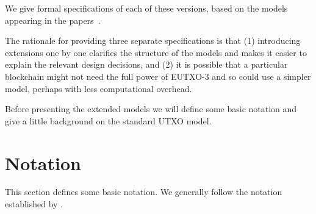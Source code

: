 \documentclass[a4paper]{article}
\theoremstyle{definition}  %
\begin{document}
\noindent We give formal specifications of each of these versions,
based on the models appearing in the
papers~\citep{Zahnentferner18-Chimeric, Zahnentferner18-UTxO}.

\medskip

The rationale for providing three separate specifications is that (1)
introducing extensions one by one clarifies the structure of the
models and makes it easier to explain the relevant design decisions,
and (2) it is possible that a particular blockchain might not need the
full power of EUTXO-3 and so could use a simpler model, perhaps with
less computational overhead.

\bigskip

\noindent Before presenting the extended models we will define some
basic notation and give a little background on the standard UTXO
model.


\section{Notation}
This section defines some basic notation.  We generally follow the
notation established by \citep{Zahnentferner18-UTxO}.
\end{document}
